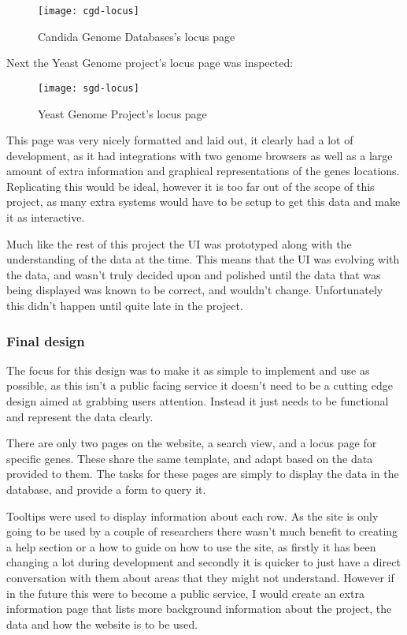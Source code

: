 \begin{figure}[ht!]
\begin{center}
\texttt{[image: cgd-locus]}
\caption{Candida Genome Databases's locus page}
\end{center}
\end{figure}

Next the Yeast Genome\cite{sgd} project's locus page was inspected:

\begin{figure}[ht!]
\begin{center}
\texttt{[image: sgd-locus]}
\caption{Yeast Genome Project's locus page}
\end{center}
\end{figure}

This page was very nicely formatted and laid out, it clearly had a lot of development, as it had integrations with two genome browsers as well as a large amount of extra information and graphical representations of the genes locations. Replicating this would be ideal, however it is too far out of the scope of this project, as many extra systems would have to be setup to get this data and make it as interactive.

Much like the rest of this project the UI was prototyped along with the understanding of the data at the time. This means that the UI was evolving with the data, and wasn't truly decided upon and polished until the data that was being displayed was known to be correct, and wouldn't change. Unfortunately this didn't happen until quite late in the project. 

\subsubsection{Final design}
The focus for this design was to make it as simple to implement and use as possible, as this isn't a public facing service it doesn't need to be a cutting edge design aimed at grabbing users attention. Instead it just needs to be functional and represent the data clearly. 

There are only two pages on the website, a search view, and a locus page for specific genes. These share the same template, and adapt based on the data provided to them. The tasks for these pages are simply to display the data in the database, and provide a form to query it.

Tooltips were used to display information about each row. As the site is only going to be used by a couple of researchers there wasn't much benefit to creating a help section or a how to guide on how to use the site, as firstly it has been changing a lot during development and secondly it is quicker to just have a direct conversation with them about areas that they might not understand. However if in the future this were to become a public service, I would create an extra information page that lists more background information about the project, the data and how the website is to be used. 

